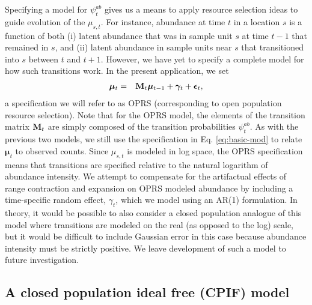\documentclass[12pt,english]{article}
\begin{document}
\begin{spacing}{1.9}
Specifying a model for $\psi^{ab}_t$ gives us a means to apply resource selection ideas to guide evolution of the $\mu_{s,t}$.  For instance, abundance at time $t$ in a location $s$ is a function of both (i) latent abundance that was in sample unit $s$ at time $t-1$ that remained in $s$, and (ii) latent abundance in sample units near $s$ that transitioned into $s$ between $t$ and $t+1$.  However, we have yet to specify a complete model for how such transitions work.  In the present application, we set
\begin{eqnarray*}
  \boldsymbol{\mu}_t & = & {\bf M}_t \boldsymbol{\mu}_{t-1} + \boldsymbol{\gamma}_t + \boldsymbol{\epsilon}_t, %
\end{eqnarray*}
a specification we will refer to as OPRS (corresponding to open population resource selection). Note that for the OPRS model, the elements of the transition matrix ${\bf M}_t$ are simply composed of the transition probabilities $\psi_t^{ab}$.  As with the previous two models, we still use the specification in Eq. \ref{eq:basic-mod} to relate $\boldsymbol{\mu}_t$ to observed counts.
Since $\mu_{s,t}$ is modeled in log space, the OPRS specification means that transitions are specified relative to the natural logarithm of abundance intensity. We attempt to compensate for the artifactual effects of range contraction and expansion on OPRS modeled abundance by including a time-specific random effect, $\gamma_t$, which we model using an AR(1) formulation.  In theory, it would be possible to also consider a closed population analogue of this model where transitions are modeled on the real (as opposed to the log) scale, but it would be difficult to include Gaussian error in this case because abundance intensity must be strictly positive.  We leave development of such a model to future investigation.


\subsection{A closed population ideal free (CPIF) model}


\end{spacing}
\end{document}
